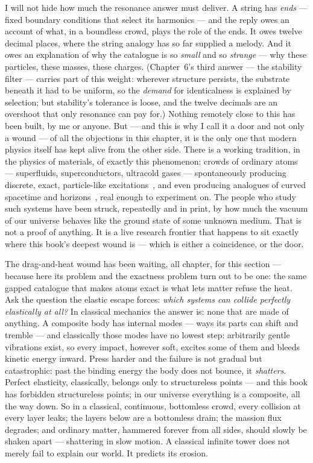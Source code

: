 \documentclass[fontsize=11pt,paper=a4,pagesize=auto,parskip=half-]{scrbook}
\begin{document}
I will not hide how much the resonance answer must deliver. A string has \emph{ends} --- fixed boundary conditions that select its harmonics --- and the reply owes an account of what, in a boundless crowd, plays the role of the ends. It owes twelve decimal places, where the string analogy has so far supplied a melody. And it owes an explanation of why the catalogue is so \emph{small} and so \emph{strange} --- why these particles, these masses, these charges. (Chapter~6's third answer --- the stability filter --- carries part of this weight: wherever structure persists, the substrate beneath it had to be uniform, so the \emph{demand} for identicalness is explained by selection; but stability's tolerance is loose, and the twelve decimals are an overshoot that only resonance can pay for.) Nothing remotely close to this has been built, by me or anyone. But --- and this is why I call it a door and not only a wound --- of all the objections in this chapter, it is the only one that modern physics itself has kept alive from the other side. There is a working tradition, in the physics of materials, of exactly this phenomenon: crowds of ordinary atoms --- superfluids, superconductors, ultracold gases --- spontaneously producing discrete, exact, particle-like excitations~\cite{volovik2003}, and even producing analogues of curved spacetime and horizons~\cite{barcelo2011}, real enough to experiment on. The people who study such systems have been struck, repeatedly and in print, by how much the vacuum of our universe behaves like the ground state of some unknown medium. That is not a proof of anything. It is a live research frontier that happens to sit exactly where this book's deepest wound is --- which is either a coincidence, or the door.


The drag-and-heat wound has been waiting, all chapter, for this section --- because here its problem and the exactness problem turn out to be one: the same gapped catalogue that makes atoms exact is what lets matter refuse the heat. Ask the question the elastic escape forces: \emph{which systems can collide perfectly elastically at all?} In classical mechanics the answer is: none that are made of anything. A composite body has internal modes --- ways its parts can shift and tremble --- and classically those modes have no lowest step: arbitrarily gentle vibrations exist, so every impact, however soft, excites some of them and bleeds kinetic energy inward. Press harder and the failure is not gradual but catastrophic: past the binding energy the body does not bounce, it \emph{shatters}. Perfect elasticity, classically, belongs only to structureless points --- and this book has forbidden structureless points; in our universe everything is a composite, all the way down. So in a classical, continuous, bottomless crowd, every collision at every layer leaks; the layers below are a bottomless drain; the massion flux degrades; and ordinary matter, hammered forever from all sides, should slowly be shaken apart --- shattering in slow motion. A classical infinite tower does not merely fail to explain our world. It predicts its erosion.
\end{document}
